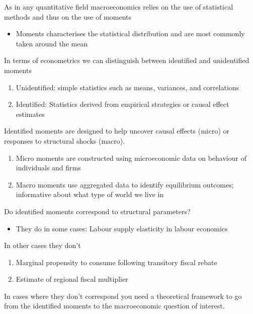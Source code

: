 \documentclass{beamer}
\begin{document}
\begin{frame}
  As in any quantitative field macroeconomics relies on the use of statistical methods and thus on the use of moments
  \begin{itemize}
    \item Moments characterises the statistical distribution and are most commonly taken around the mean
  \end{itemize}
  \medskip
  In terms of econometrics we can distinguish between identified and unidentified moments
  \begin{enumerate}
    \item Unidentified: simple statistics such as means, variances, and correlations
    \item Identified: Statistics derived from empirical strategies or causal effect estimates 
  \end{enumerate}
\end{frame}

\begin{frame}
 Identified moments are designed to help uncover causal effects (micro) or responses to structural shocks (macro).
 \begin{enumerate}
   \item Micro moments are constructed using microeconomic data on behaviour of individuals and firms
   \item Macro moments use aggregated data to identify equilibrium outcomes; informative about what type of world we live in 
  \end{enumerate} 
\end{frame}

\begin{frame}
  Do identified moments correspond to structural parameters?
  \begin{itemize}
    \item They do in some cases: Labour supply elasticity in labour economics
  \end{itemize}
  \medskip
  In other cases they don't
  \begin{enumerate}
    \item Marginal propensity to consume following transitory fiscal rebate
    \item Estimate of regional fiscal multiplier
  \end{enumerate}
  \medskip
  In cases where they don't correspond you need a theoretical framework to go from the identified moments to the macroeconomic question of interest.
\end{frame}
\end{document}
